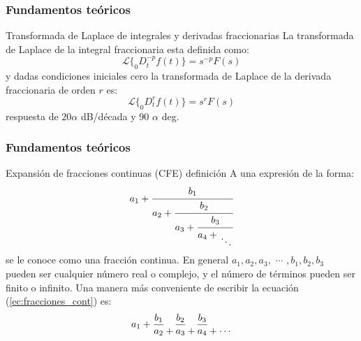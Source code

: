 \documentclass[10pt]{beamer}
\begin{document}
	\begin{frame}
		\frametitle{Fundamentos teóricos}
		\begin{block}{Transformada de Laplace de integrales y derivadas fraccionarias}
		\justifying
			La transformada de Laplace de la integral fraccionaria esta definida como:
			\begin{equation}
	 			\mathcal{L} \{ _{0}D_{t}^{-p} f(t) \} = s^{-p} F(s)
			\end{equation} 
			y dadas condiciones iniciales cero  la transformada de Laplace de la derivada fraccionaria de orden $r$ es:
			\begin{equation}
				\mathcal{L} \{ _{0}D_{t}^{r} f(t) \} = s^{r} F(s)
			\end{equation}
			respuesta de $20\alpha$ dB/década y 90 $\alpha$ deg.
		\end{block}
	\end{frame}	
	\begin{frame}
		\frametitle{Fundamentos teóricos}
		\begin{block}{Expansión de fracciones continuas (CFE) definición}
		\justifying
			A una expresión de la forma:
				\begin{equation}
			a_{1} + \cfrac{b_{1}}{a_{2} + \cfrac{b_{2}}{a_{3} + \cfrac{b_{3}}{a_{4} + \genfrac{}{}{0pt}{0}{}{\ddots}}}}
			\label{ec:fracciones_cont}
		\end{equation} 
	se le conoce como una fracción continua. En general $a_{1},a_{2},a_{3},$ $\cdots$ $, b_{1}, b_{2}, b_{3}$ pueden ser cualquier número real o complejo, y el número de términos pueden ser finito o infinito.
	Una manera más conveniente de escribir la ecuación (\ref{ec:fracciones_cont}) es:
	\begin{equation}
		a_{1} + \frac{b_{1}}{a_{2} } \genfrac{}{}{0pt}{0}{}{+}   \frac{b_{2}}{a_{3}}  \genfrac{}{}{0pt}{0}{}{+}  \frac{b_{3}}{a_{4}}  \genfrac{}{}{0pt}{0}{}{+}  \genfrac{}{}{0pt}{0}{}{\cdots} 
		\label{ec:fracciones_cont_sim}
	\end{equation}
		\end{block}
	\end{frame}
\end{document}
